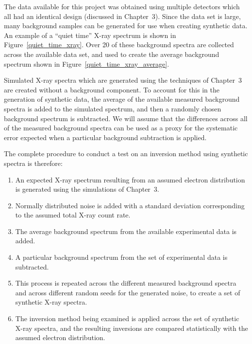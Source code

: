 The data available for this project was obtained using multiple detectors which all had an identical design (discussed in Chapter~3). Since the data set is large, many background samples can be generated for use when creating synthetic data. An example of a ``quiet time'' X-ray spectrum is shown in Figure~\ref{quiet_time_xray}. Over 20 of these background spectra are collected across the available data set, and used to create the average background spectrum shown in Figure~\ref{quiet_time_xray_average}.

Simulated X-ray spectra which are generated using the techniques of Chapter~3 are created without a background component. To account for this in the generation of synthetic data, the average of the available measured background spectra is added to the simulated spectrum, and then a randomly chosen background spectrum is subtracted. We will assume that the differences across all of the measured background spectra can be used as a proxy for the systematic error
expected when a particular background subtraction is applied. 

The complete procedure to conduct a test on an inversion method using synthetic spectra is therefore: 

\begin{enumerate}
    \item An expected X-ray spectrum resulting from an assumed electron distribution is generated using the simulations of Chapter~3. 
    \item Normally distributed noise is added with a standard deviation corresponding to the assumed total X-ray count rate.
    \item The average background spectrum from the available experimental data is added.
    \item A particular background spectrum from the set of experimental data is subtracted.
    \item This process is repeated across the different measured background spectra and across different random seeds for the generated noise, to create a set of synthetic X-ray spectra.
    \item The inversion method being examined is applied across the set of synthetic X-ray spectra, and the resulting inversions are compared statistically with the assumed electron distribution. 
\end{enumerate}


